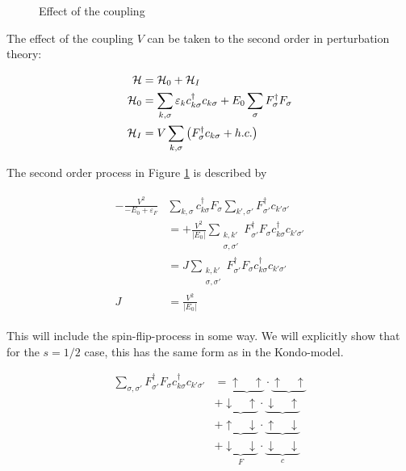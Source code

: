 \begin{figure}[h]
	\centering
	
	\caption{Effect of the coupling}
	\label{fig:band_anderson}
\end{figure}

The effect of the coupling \(V\) can be taken to the second order in perturbation theory:

\begin{align}
\begin{split}
\mathcal{H} &= \mathcal{H}_0  + \mathcal{H}_I \\
\mathcal{H}_0 &= \sum_{k,\sigma}\varepsilon_k c_{k\sigma}^\dagger c_{k\sigma} + E_0\sum_\sigma F_\sigma^\dagger F_\sigma \\
\mathcal{H}_I  &= V\sum_{k,\sigma}\left(F_\sigma^\dagger c_{k\sigma} +  h.c.\right)
\end{split}
\end{align}

The second order process in Figure \ref{fig:band_anderson} is described by

\begin{align}
\begin{split}
	-\frac{V^2}{-E_0 + \varepsilon_F}&\sum_{k,\sigma}c_{k\sigma}^\dagger F_\sigma \sum_{k',\sigma'}F_{\sigma'}^\dagger c_{k'\sigma'} \\
	&= +\frac{V^2}{|E_0|}\sum_{\substack{k,k' \\ \sigma,\sigma'}} F_{\sigma'}^\dagger F_\sigma c_{k\sigma}^\dagger c_{k'\sigma'} \\
	 &= J\sum_{\substack{k,k' \\ \sigma,\sigma'}}F_{\sigma'}^\dagger F_\sigma c_{k\sigma}^\dagger c_{k'\sigma'} \\
	 J &= \frac{V^2}{|E_0|}
\end{split}
\end{align}

This will include the spin-flip-process in some way. We will explicitly show that for the $s = 1/2$ case, this has the same form as in the Kondo-model. 

\begin{align*}
\sum_{\sigma,\sigma'}F_{\sigma'}^\dagger F_\sigma c_{k\sigma}^\dagger c_{k'\sigma'} &= \underbrace{\uparrow\quad \uparrow} \cdot \underbrace{\uparrow\quad \uparrow}\\
&+ \underbrace{\downarrow\quad \uparrow}\cdot\underbrace{\downarrow\quad \uparrow} \\
&+ \underbrace{\uparrow\quad \downarrow}\cdot\underbrace{\uparrow\quad \downarrow} \\
&+ \underbrace{\downarrow\quad \downarrow}_{F}\cdot\underbrace{\downarrow\quad \downarrow}_{c}
\end{align*}

